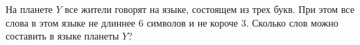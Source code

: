 
На планете $Y$ все жители говорят на языке, состоящем из трех букв. 
При этом все слова в этом языке не длиннее 6 символов и не короче 3. 
Сколько слов можно составить в языке планеты $Y$?

\soultionSection

